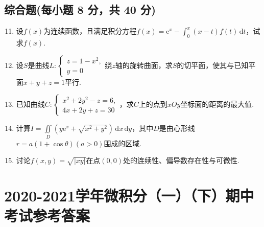 \documentclass[../Main.tex]{subfiles}
\begin{document}
\section{综合题(每小题 8 分，共 40 分)}
\begin{enumerate}
    \setcounter{enumi}{10}
    \item 设$f(x)$为连续函数，且满足积分方程$f(x)=\mathrm{e}^{x}-\int_{0}^{x}
              (x-t)f(t)\,\mathrm{d}t$，试求$f(x)$.
          \vspace{12em}

    \item 设$S$是曲线$L:
              \begin{cases}
                  z=1-x^{2}, \\
                  y=0
              \end{cases}$绕$z$轴的旋转曲面，求$S$的切平面，使其与已知平面$x+y+z=1$平行.
          \vspace{12em}

    \item 已知曲线$C:
              \begin{cases}
                  x^{2}+2y^{2}-z=6, \\
                  4x+2y+z=30
              \end{cases}$，求$C$上的点到$xOy$坐标面的距离的最大值.
          \vspace{12em}

    \item 计算$I=\iint\limits_{D}\left(y\mathrm{e}^{x}+\sqrt{x^{2}+y^{2}}\right
              )\,\mathrm{d}x\,\mathrm{d}y$，其中$D$是由心形线$r=a\left(1+\cos\theta\right)(a>
              0)$围成的区域.
          \vspace{12em}

    \item 讨论$f(x,y)=\sqrt{|xy|}$在点$(0,0)$处的连续性、偏导数存在性与可微性.
          \vspace{12em}
\end{enumerate}

\chapter{2020-2021学年微积分（一）（下）期中考试参考答案}
\end{document}
